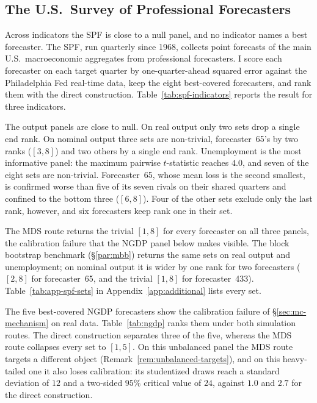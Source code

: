 \subsection{The U.S.\ Survey of Professional Forecasters}
\label{sec:apps-spf}

Across indicators the SPF is close to a null panel, and no indicator names a best
forecaster. The SPF, run quarterly since 1968, collects point forecasts of the main U.S.\
macroeconomic aggregates from professional forecasters. I score each forecaster on each
target quarter by one-quarter-ahead squared error against the Philadelphia Fed real-time
data, keep the eight best-covered forecasters, and rank them with the direct
construction. Table~\ref{tab:spf-indicators} reports the result for three indicators.

The output panels are close to null. On real output only two sets drop a single end
rank. On nominal output three sets are non-trivial, forecaster~65's by two ranks
($[3,8]$) and two others by a single end rank. Unemployment is the most informative
panel: the maximum pairwise $t$-statistic reaches $4.0$, and seven of the eight sets are
non-trivial. Forecaster~65, whose mean loss is the second smallest, is confirmed worse
than five of its seven rivals on their shared quarters and confined to the bottom three
($[6,8]$). Four of the other sets exclude only the last rank, however, and six
forecasters keep rank one in their set.

The MDS route returns the trivial $[1,8]$ for every forecaster on all three panels, the
calibration failure that the NGDP panel below makes visible. The block bootstrap
benchmark (\S\ref{par:mbb}) returns the same sets on real output and unemployment; on
nominal output it is wider by one rank for two forecasters ($[2,8]$ for forecaster~65,
and the trivial $[1,8]$ for forecaster~433). Table~\ref{tab:app-spf-sets} in
Appendix~\ref{app:additional} lists every set.

\tabSpfIndicators

The five best-covered NGDP forecasters show the calibration failure of
\S\ref{sec:mc-mechanism} on real data. Table~\ref{tab:ngdp} ranks them under both
simulation routes. The direct construction separates three of the five, whereas the MDS
route collapses every set to $[1,5]$. On this unbalanced panel the MDS route targets a
different object (Remark~\ref{rem:unbalanced-targets}), and on this heavy-tailed one it
also loses calibration: its studentized draws reach a standard deviation of $12$ and a
two-sided $95\%$ critical value of $24$, against $1.0$ and $2.7$ for the direct
construction.

